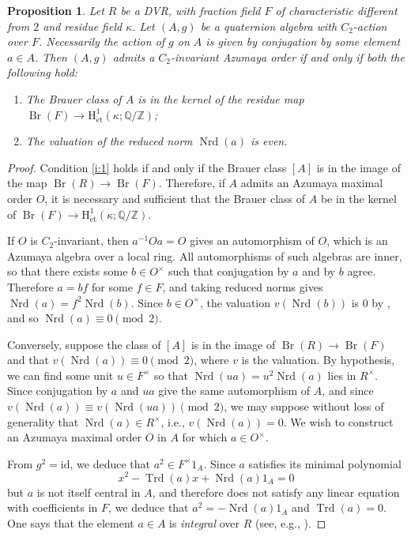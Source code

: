 \documentclass[reqno,oneside,dvipsnames,pdfnames,final]{amsart}
\newtheorem{prop}[thm]{Proposition}
\theoremstyle{definition}
\newcommand{\Q}{\mathbb{Q}}
\newcommand{\Z}{\mathbb{Z}}
\DeclareMathOperator{\Br}{Br}
\newcommand{\et}{\mathrm{\acute et}}
\newcommand{\Hoh}{\mathrm{H}}
\newcommand{\Nrd}{\operatorname{Nrd}}
\newcommand{\Trd}{\operatorname{Trd}}
\newcommand{\id}{\mathrm{id}}
\begin{document}
\begin{prop} \label{pr:DVR} Let $R$ be a DVR, with fraction field $F$ of characteristic different from $2$ and residue field $\kappa$. Let $(A,g)$ be a quaternion algebra with $C_2$-action over $F$. Necessarily the action of $g$ on $A$ is given by conjugation by some element $a \in A$. Then $(A,g)$ admits a $C_2$-invariant Azumaya order if and only if both the following hold:
  \begin{enumerate}
  \item \label{i:1}  The Brauer class of $A$ is in the kernel of the residue map $\Br(F) \to \Hoh^1_\et(\kappa; \Q/\Z)$;
  \item \label{i:2} The valuation of the reduced norm $\Nrd(a)$ is even.
  \end{enumerate}  
\end{prop}
\begin{proof}
  Condition \ref{i:1} holds if and only if the Brauer class $[A]$ is in the image of the map $\Br(R) \to \Br(F)$. Therefore, if $A$ admits an Azumaya maximal order $O$, it is necessary and sufficient that the Brauer class of $A$ be in the kernel of $\Br(F) \to \Hoh^1_\et(\kappa; \Q/\Z)$.

  If $O$ is $C_2$-invariant, then $a^{-1}Oa = O$ gives an automorphism of $O$, which is an Azumaya algebra over a local ring. All automorphisms of such algebras are inner, so that there exists some $b \in O^\times$ such that conjugation by $a$ and by $b$ agree. Therefore $a=bf$ for some $f \in F$, and taking reduced norms gives $\Nrd(a) = f^2\Nrd(b)$. Since $b \in O^\times$, the valuation $v(\Nrd(b))$ is $0$ by \cite[Lemma 10.3.7]{Voight2021}, and so $\Nrd(a) \equiv 0 \pmod 2$.

   Conversely, suppose the class of $[A]$ is in the image of $\Br(R) \to \Br(F)$ and that $v(\Nrd(a)) \equiv 0 \pmod 2$, where $v$ is the valuation. By hypothesis, we can find some unit $u \in F^\times$ so that $\Nrd(ua) = u^2 \Nrd(a)$ lies in $R^\times$.  Since conjugation by $a$ and $ua$ give the same automorphism of $A$, and since $v(\Nrd(a)) \equiv v(\Nrd(ua)) \pmod 2$, we may suppose without loss of generality that $\Nrd(a) \in R^\times$, i.e., $v(\Nrd(a)) = 0$. We wish to construct an Azumaya maximal order $O$ in $A$ for which $a \in O^\times$.

  From $g^2 = \id$, we deduce that $a^2 \in F^\times1_A$. Since $a$ satisfies its minimal polynomial
  \[ x^2 - \Trd(a) x + \Nrd(a) 1_A = 0 \]
  but $a$ is not itself central in $A$, and therefore does not satisfy any linear equation with coefficients in $F$, we deduce that $a^2 = -\Nrd(a)1_A$ and $\Trd(a) = 0$. One says that the element $a \in A$ is \emph{integral} over $R$ (see, e.g., \cite[Def.~10.3.1]{Voight2021}).


\end{proof}
\end{document}
